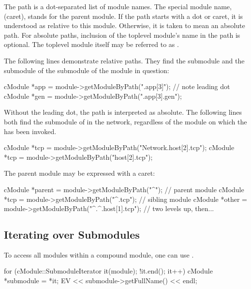 The path is a dot-separated list of module names. The special module name,
\ttt{\textasciicircum} (caret), stands for the parent module. If the path
starts with a dot or caret, it is understood as relative to this module.
Otherwise, it is taken to mean an absolute path. For absolute paths,
inclusion of the toplevel module's name in the path is optional.
The toplevel module itself may be referred to as .

The following lines demonstrate relative paths. They find the 
submodule and the  submodule of the  submodule of the
module in question:

\begin{cpp}
cModule *app = module->getModuleByPath(".app[3]");  // note leading dot
cModule *gen = module->getModuleByPath(".app[3].gen");
\end{cpp}

Without the leading dot, the path is interpreted as absolute. The following
lines both find the  submodule of  in the network,
regardless of the module on which the  has been
invoked.

\begin{cpp}
cModule *tcp = module->getModuleByPath("Network.host[2].tcp");
cModule *tcp = module->getModuleByPath("host[2].tcp");
\end{cpp}

The parent module may be expressed with a caret:

\begin{cpp}
cModule *parent = module->getModuleByPath("^"); // parent module
cModule *tcp = module->getModuleByPath("^.tcp"); // sibling module
cModule *other = module->getModuleByPath("^.^.host[1].tcp"); // two levels up, then...
\end{cpp}


\subsection{Iterating over Submodules}
\label{sec:simple-modules:iterating-over-submodules}

To access all modules within a compound module,
one can use .

\begin{cpp}
for (cModule::SubmoduleIterator it(module); !it.end(); it++) {
    cModule *submodule = *it;
    EV << submodule->getFullName() << endl;
}
\end{cpp}



